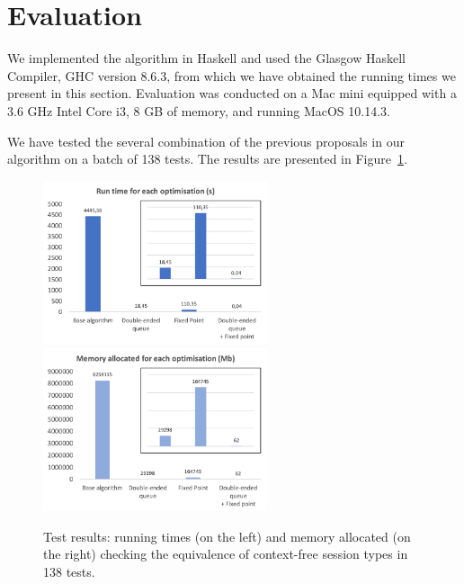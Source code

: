 \section{Evaluation}
\label{sec:evaluation}


We implemented the algorithm
in Haskell and used the Glasgow Haskell Compiler, GHC version 8.6.3,
from which we have obtained the running times we present in this
section.  Evaluation was conducted on a Mac mini equipped with a 3.6
GHz Intel Core i3, 8 GB of memory, and running MacOS 10.14.3.
%


We have tested the several combination of the previous proposals
in our algorithm on a batch of 138 tests. The results are presented 
in Figure~\ref{fig:results}.

\begin{figure}[h]
	\includegraphics[height=4.8cm]{img/run_time}	\qquad 
	\includegraphics[height=4.8cm]{img/memory_alloc}	
	\caption{Test results: running times (on the left) and
	memory allocated (on the right) checking the equivalence 
	of context-free session types in 138 tests.}
	\label{fig:results}
\end{figure}


